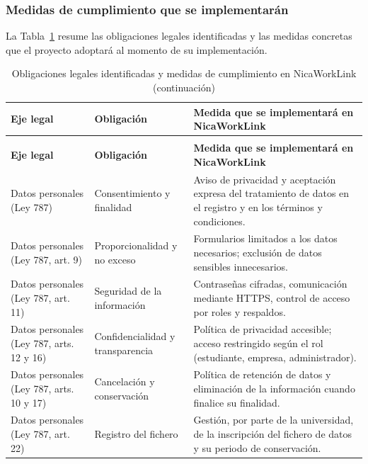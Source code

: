 \subsubsection{Medidas de cumplimiento que se implementarán}

La Tabla~\ref{tab:medidas-legales} resume las obligaciones legales identificadas y las medidas concretas que el proyecto adoptará al momento de su implementación.

\begin{longtable}{@{}>{\raggedright\arraybackslash}p{3.4cm}>{\raggedright\arraybackslash}p{3.4cm}>{\raggedright\arraybackslash}p{7.2cm}@{}}
\caption{Obligaciones legales identificadas y medidas de cumplimiento en NicaWorkLink}\label{tab:medidas-legales}\\
\hline
\textbf{Eje legal} & \textbf{Obligación} & \textbf{Medida que se implementará en NicaWorkLink} \\
\hline
\endfirsthead
\caption[]{Obligaciones legales identificadas y medidas de cumplimiento en NicaWorkLink (continuación)}\\
\hline
\textbf{Eje legal} & \textbf{Obligación} & \textbf{Medida que se implementará en NicaWorkLink} \\
\hline
\endhead
\hline
\endlastfoot
Datos personales (Ley 787) & Consentimiento y finalidad & Aviso de privacidad y aceptación expresa del tratamiento de datos en el registro y en los términos y condiciones. \\
\hline
Datos personales (Ley 787, art. 9) & Proporcionalidad y no exceso & Formularios limitados a los datos necesarios; exclusión de datos sensibles innecesarios. \\
\hline
Datos personales (Ley 787, art. 11) & Seguridad de la información & Contraseñas cifradas, comunicación mediante HTTPS, control de acceso por roles y respaldos. \\
\hline
Datos personales (Ley 787, arts. 12 y 16) & Confidencialidad y transparencia & Política de privacidad accesible; acceso restringido según el rol (estudiante, empresa, administrador). \\
\hline
Datos personales (Ley 787, arts. 10 y 17) & Cancelación y conservación & Política de retención de datos y eliminación de la información cuando finalice su finalidad. \\
\hline
Datos personales (Ley 787, art. 22) & Registro del fichero & Gestión, por parte de la universidad, de la inscripción del fichero de datos y su periodo de conservación. \\
\hline

\end{longtable}
